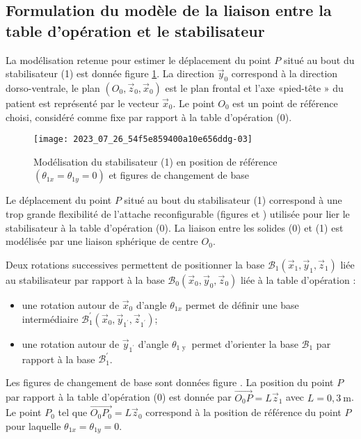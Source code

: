 \subsection{\label{sec:I.B}Formulation du modèle de la liaison entre la table d'opération et le stabilisateur}
\ifprof
\else
La modélisation retenue pour estimer le déplacement du point $P$ situé au bout du stabilisateur (1) est donnée figure \ref{fig_ccspsi2022:05}. La direction $\vec{y}_{0}$ correspond à la direction dorso-ventrale, le plan $\left(O_{0}, \vec{z}_{0}, \vec{x}_{0}\right)$ est le plan frontal et l'axe «pied-tête » du patient est représenté par le vecteur $\vec{x}_{0}$. Le point $O_{0}$ est un point de référence choisi, considéré comme fixe par rapport à la table d'opération (0).

\begin{figure}[!h]
\centering
\texttt{[image: 2023\_07\_26\_54f5e859400a10e656ddg-03]}
\caption{Modélisation du stabilisateur (1) en position de référence $\left(\theta_{1 x}=\theta_{1 y}=0\right)$ et figures de changement de base\label{fig_ccspsi2022:05}}
\end{figure}


Le déplacement du point $P$ situé au bout du stabilisateur (1) correspond à une trop grande flexibilité de l'attache reconfigurable (figures \label{fig_ccspsi2022:01} et \label{fig_ccspsi2022:02}) utilisée pour lier le stabilisateur à la table d'opération (0). La liaison entre les solides (0) et (1) est modélisée par une liaison sphérique de centre $O_{0}$.

Deux rotations successives permettent de positionner la base $\mathcal{B}_{1}\left(\vec{x}_{1}, \vec{y}_{1}, \vec{z}_{1}\right)$ liée au stabilisateur par rapport à la base $\mathcal{B}_{0}\left(\vec{x}_{0}, \vec{y}_{0}, \vec{z}_{0}\right)$ liée à la table d'opération :
\begin{itemize}
\item une rotation autour de $\vec{x}_{0}$ d'angle $\theta_{1 x}$ permet de définir une base intermédiaire $\mathcal{B}_{1}^{\prime}\left(\vec{x}_{0}, \vec{y}_{1^{\prime}}, \vec{z}_{1^{\prime}}\right)$;
\item une rotation autour de $\vec{y}_{1^{\prime}}$ d'angle $\theta_{1 \text { y }}$ permet d'orienter la base $\mathcal{B}_{1}$ par rapport à la base $\mathcal{B}_{1}^{\prime}$.
\end{itemize}

Les figures de changement de base sont données figure \label{fig_ccspsi2022:05}. La position du point $P$ par rapport à la table d'opération (0) est donnée par $\overrightarrow{O_{0} P}=L \vec{z}_{1}$ avec $L=0,3 \mathrm{~m}$. Le point $P_{0}$ tel que $\overrightarrow{O_{0} P_{0}}=L \vec{z}_{0}$ correspond à la position de référence du point $P$ pour laquelle $\theta_{1 x}=\theta_{1 y}=0$.
\fi

